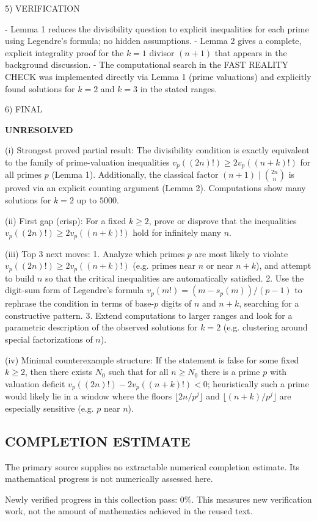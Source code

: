 5) VERIFICATION

- Lemma 1 reduces the divisibility question to explicit inequalities for each prime using Legendre's formula; no hidden assumptions.
- Lemma 2 gives a complete, explicit integrality proof for the $k=1$ divisor $(n+1)$ that appears in the background discussion.
- The computational search in the FAST REALITY CHECK was implemented directly via Lemma 1 (prime valuations) and explicitly found solutions for $k=2$ and $k=3$ in the stated ranges.

6) FINAL

\textbf{UNRESOLVED}

(i) Strongest proved partial result: The divisibility condition is exactly equivalent to the family of prime-valuation inequalities $v_p((2n)!)\ge 2v_p((n+k)!)$ for all primes $p$ (Lemma 1). Additionally, the classical factor $(n+1)\mid\binom{2n}{n}$ is proved via an explicit counting argument (Lemma 2). Computations show many solutions for $k=2$ up to $5000$.

(ii) First gap (crisp): For a fixed $k\ge 2$, prove or disprove that the inequalities $v_p((2n)!)\ge 2v_p((n+k)!)$ hold for infinitely many $n$.

(iii) Top 3 next moves:
  1. Analyze which primes $p$ are most likely to violate $v_p((2n)!)\ge 2v_p((n+k)!)$ (e.g. primes near $n$ or near $n+k$), and attempt to build $n$ so that the critical inequalities are automatically satisfied.
  2. Use the digit-sum form of Legendre's formula $v_p(m!)=(m-s_p(m))/(p-1)$ to rephrase the condition in terms of base-$p$ digits of $n$ and $n+k$, searching for a constructive pattern.
  3. Extend computations to larger ranges and look for a parametric description of the observed solutions for $k=2$ (e.g. clustering around special factorizations of $n$).

(iv) Minimal counterexample structure: If the statement is false for some fixed $k\ge 2$, then there exists $N_0$ such that for all $n\ge N_0$ there is a prime $p$ with valuation deficit $v_p((2n)!)-2v_p((n+k)!)<0$; heuristically such a prime would likely lie in a window where the floors $\lfloor 2n/p^j\rfloor$ and $\lfloor (n+k)/p^j\rfloor$ are especially sensitive (e.g. $p$ near $n$).


\subsection*{COMPLETION ESTIMATE}
The primary source supplies no extractable numerical completion estimate. Its mathematical progress is not numerically assessed here.

Newly verified progress in this collection pass: $0\%$. This measures new verification work, not the amount of mathematics achieved in the reused text.
